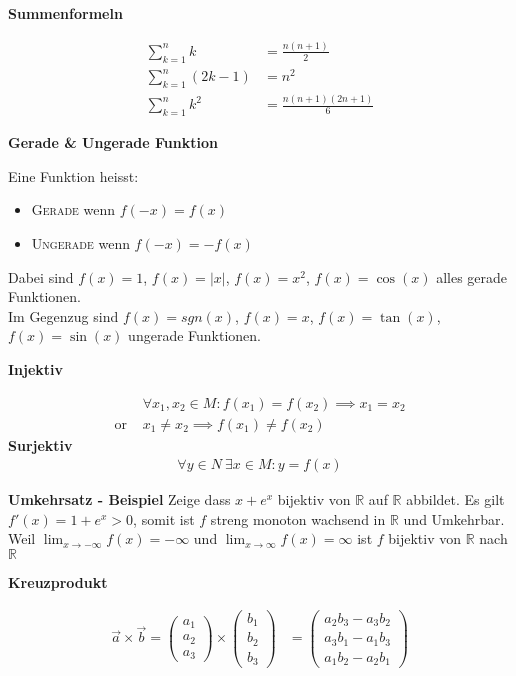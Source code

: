 \documentclass[25pt]{sciposter}
\newcommand{\R}{\mathbb{R}}
\newenvironment{method}[1]{\begin{mdframed}[backgroundcolor=blue!10,innertopmargin=15pt, innerbottommargin=15pt,nobreak=true]
		\textbf{#1 }
	}
	{ 
	\end{mdframed}
}
\begin{document}
\begin{multicols}{3}
		
		\begin{method}{Summenformeln}
			\begin{align*}
				\sum _{{k=1}}^{n}k &= {\frac  {n(n+1)}{2}}\\
				\sum_{k=1}^n (2k-1) &= n^2\\
				\sum _{{k=1}}^{n}k^{2} &= {\frac  {n(n+1)(2n+1)}{6}}
			\end{align*}
		\end{method}
		
		
		\begin{method}{Gerade \& Ungerade Funktion}
			Eine Funktion heisst:
			\begin{itemize}
				\item \textsc{Gerade} wenn $f(-x) = f(x)$
				\item \textsc{Ungerade} wenn $f(-x) = - f(x)$
			\end{itemize}
			Dabei sind $f(x) = 1$, $f(x) = |x|$, $f(x)=x^2$, $f(x) = \cos(x)$ alles gerade Funktionen.\\
			Im Gegenzug sind $f(x) = sgn(x)$, $f(x) = x$, $f(x) = \tan(x)$, $f(x) = \sin(x)$ ungerade Funktionen.
		\end{method}
		
		
		\begin{method}{Injektiv}
			\begin{align*}
				&\forall x_1,x_2 \in M : f(x_1) = f(x_2) \implies x_1 = x_2\\
				\text{or }  &x_1 \not = x_2 \implies f(x_1) \not = f(x_2)
			\end{align*}
			\textbf{Surjektiv}
			\begin{align*}
				\forall y \in N  \ \exists x \in M : y = f(x)
			\end{align*}
		\end{method}
		
		\textbf{Umkehrsatz - Beispiel} Zeige dass $x + e^x$ bijektiv von $\R$ auf $\R$ abbildet. Es gilt $f'(x) = 1 + e^x > 0$, somit ist $f$ streng monoton wachsend in $\R$ und Umkehrbar. Weil $\lim_{x \to -\infty} f(x) = - \infty$ und $\lim_{x \to \infty} f(x) = \infty$ ist $f$ bijektiv von $\R$ nach $\R$
		
		
		
		\begin{method}{Kreuzprodukt}
			\begin{align*}
				\vec{a}\times\vec{b}=	\begin{pmatrix}a_1 \\ a_2 \\ a_3\end{pmatrix}
				\times
				\begin{pmatrix}b_1 \\ b_2 \\ b_3 \end{pmatrix} &=	\begin{pmatrix}
					a_2b_3 - a_3b_2 \\
					a_3b_1 - a_1b_3 \\
					a_1b_2 - a_2b_1
				\end{pmatrix}
			\end{align*}
		\end{method}
		

\end{multicols}
\end{document}
